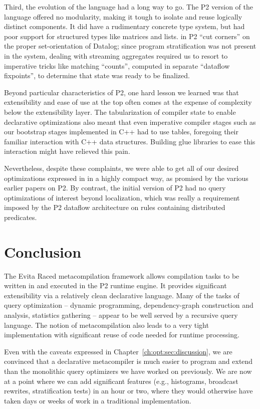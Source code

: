 Third, the evolution of the \OVERLOG language had a long way to go.  The P2
version of the language offered no modularity, making it tough to isolate and
reuse logically distinct components.  It did have a rudimentary concrete type
system, but had poor support for structured types like matrices and lists.
\OVERLOG in P2 ``cut corners'' on the proper set-orientation of Datalog; since
program stratification was not present in the system, dealing with streaming
aggregates required us to resort to imperative tricks like matching ``counts'',
computed in separate ``dataflow fixpoints'', to determine that state was ready
to be finalized.

Beyond particular characteristics of P2, one hard lesson we learned was that
extensibility and ease of use at the top often comes at the expense of
complexity below the extensibility layer.  The tabularization of compiler state
to enable declarative optimizations also meant that even imperative compiler
stages such as our bootstrap stages implemented in C++ had to use tables,
foregoing their familiar interaction with C++ data structures.  Building glue
libraries to ease this interaction might have relieved this pain.

Nevertheless, despite these complaints, we were able to get all of our desired
optimizations expressed in \OVERLOG in a highly compact way, as promised by the
various earlier papers on P2.  By contrast, the initial version of P2 had no
query optimizations of interest beyond localization, which was really a
requirement imposed by the P2 dataflow architecture on rules containing
distributed predicates.

\section{Conclusion} 
\label{ch:opt:sec:summary} 

The Evita Raced metacompilation framework allows \OVERLOG compilation tasks to
be written in \OVERLOG and executed in the P2 runtime engine.  It provides
significant extensibility via a relatively clean declarative language.  Many of
the tasks of query optimization -- dynamic programming, dependency-graph
construction and analysis, statistics gathering -- appear to be well served by
a recursive query language.  The notion of metacompilation also leads to a very
tight implementation with significant reuse of code needed for runtime
processing.

Even with the caveats expressed in Chapter~\ref{ch:opt:sec:discussion}, we are
convinced that a declarative metacompiler is much easier to program and extend
than the monolithic query optimizers we have worked on previously.  We are now
at a point where we can add significant features (e.g., histograms, broadcast
rewrites, stratification tests) in an hour or two, where they would otherwise
have taken days or weeks of work in a traditional implementation.

